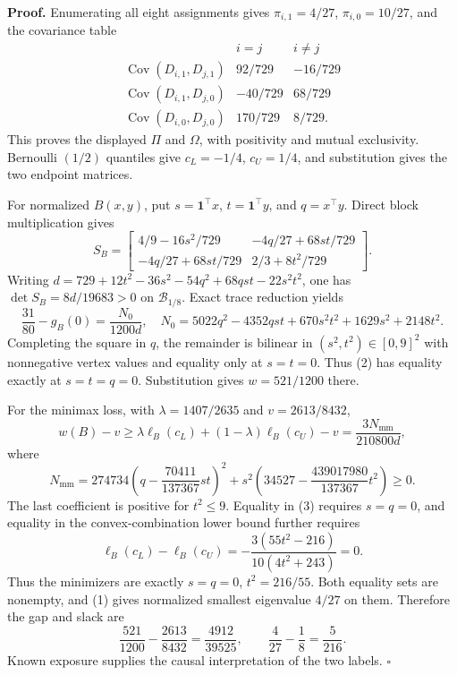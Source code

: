 \textbf{Proof.}
Enumerating all eight assignments gives \(\pi_{i,1}=4/27\), \(\pi_{i,0}=10/27\), and the covariance table
\[
\begin{array}{c|cc}
&i=j&i\ne j\\ \hline
\operatorname{Cov}(D_{i,1},D_{j,1})&92/729&-16/729\\
\operatorname{Cov}(D_{i,1},D_{j,0})&-40/729&68/729\\
\operatorname{Cov}(D_{i,0},D_{j,0})&170/729&8/729.
\end{array}
\]
This proves the displayed \(\Pi\) and \(\Omega\), with positivity and mutual exclusivity.  Bernoulli \((1/2)\) quantiles give \(c_L=-1/4\), \(c_U=1/4\), and substitution gives the two endpoint matrices.

For normalized \(B(x,y)\), put \(s=\mathbf1^\top x\), \(t=\mathbf1^\top y\), and \(q=x^\top y\).  Direct block multiplication gives
\[
S_B=\begin{bmatrix}4/9-16s^2/729&-4q/27+68st/729\\
-4q/27+68st/729&2/3+8t^2/729\end{bmatrix}.
\tag{1}
\]
Writing \(d=729+12t^2-36s^2-54q^2+68qst-22s^2t^2\), one has \(\det S_B=8d/19683>0\) on \(\mathcal B_{1/8}\).  Exact trace reduction yields
\[
\frac{31}{80}-g_B(0)=\frac{N_0}{1200d},
\quad
N_0=5022q^2-4352qst+670s^2t^2+1629s^2+2148t^2.
\tag{2}
\]
Completing the square in \(q\), the remainder is bilinear in \((s^2,t^2)\in[0,9]^2\) with nonnegative vertex values and equality only at \(s=t=0\).  Thus (2) has equality exactly at \(s=t=q=0\).  Substitution gives \(w=521/1200\) there.

For the minimax loss, with \(\lambda=1407/2635\) and \(v=2613/8432\),
\[
w(B)-v\ge\lambda\ell_B(c_L)+(1-\lambda)\ell_B(c_U)-v
=\frac{3N_{\mathrm{mm}}}{210800d},
\]
where
\[
N_{\mathrm{mm}}=274734\left(q-\frac{70411}{137367}st\right)^2
+s^2\left(34527-\frac{439017980}{137367}t^2\right)\ge0.
\tag{3}
\]
The last coefficient is positive for \(t^2\le9\).  Equality in (3) requires \(s=q=0\), and equality in the convex-combination lower bound further requires
\[
\ell_B(c_L)-\ell_B(c_U)
=-\frac{3(55t^2-216)}{10(4t^2+243)}=0.
\]
Thus the minimizers are exactly \(s=q=0\), \(t^2=216/55\).  Both equality sets are nonempty, and (1) gives normalized smallest eigenvalue \(4/27\) on them.  Therefore the gap and slack are
\[
\frac{521}{1200}-\frac{2613}{8432}=\frac{4912}{39525},
\qquad \frac4{27}-\frac18=\frac5{216}.
\]
Known exposure supplies the causal interpretation of the two labels. \(\square\)